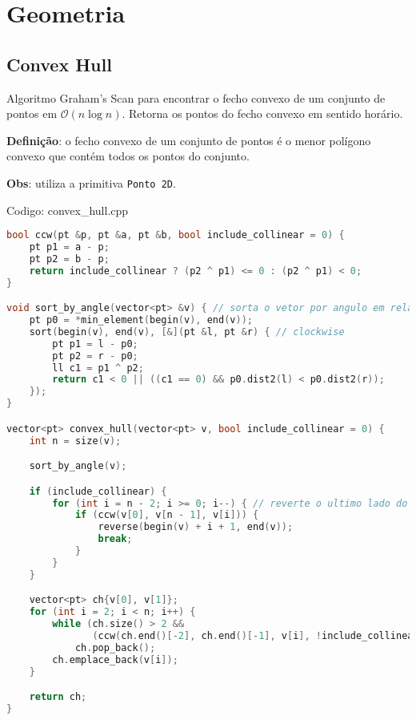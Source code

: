 \documentclass[10pt, a4paper, oneside]{book}
\begin{document}
\newpage

%
%
%
%

\chapter{Geometria}

\section{Convex Hull}


Algoritmo Graham's Scan para encontrar o fecho convexo de um conjunto de pontos em $\mathcal{O}(n \log n)$. Retorna os pontos do fecho convexo em sentido horário.



\textbf{Definição}: o fecho convexo de um conjunto de pontos é o menor polígono convexo que contém todos os pontos do conjunto.



\textbf{Obs}: utiliza a primitiva \texttt{Ponto 2D}. 

\hfill

Codigo: convex\_hull.cpp

\begin{lstlisting}[language=C++]
bool ccw(pt &p, pt &a, pt &b, bool include_collinear = 0) {
    pt p1 = a - p;
    pt p2 = b - p;
    return include_collinear ? (p2 ^ p1) <= 0 : (p2 ^ p1) < 0;
}

void sort_by_angle(vector<pt> &v) { // sorta o vetor por angulo em relacao ao pivo
    pt p0 = *min_element(begin(v), end(v));
    sort(begin(v), end(v), [&](pt &l, pt &r) { // clockwise
        pt p1 = l - p0;
        pt p2 = r - p0;
        ll c1 = p1 ^ p2;
        return c1 < 0 || ((c1 == 0) && p0.dist2(l) < p0.dist2(r));
    });
}

vector<pt> convex_hull(vector<pt> v, bool include_collinear = 0) {
    int n = size(v);

    sort_by_angle(v);

    if (include_collinear) {
        for (int i = n - 2; i >= 0; i--) { // reverte o ultimo lado do poligono
            if (ccw(v[0], v[n - 1], v[i])) {
                reverse(begin(v) + i + 1, end(v));
                break;
            }
        }
    }

    vector<pt> ch{v[0], v[1]};
    for (int i = 2; i < n; i++) {
        while (ch.size() > 2 &&
               (ccw(ch.end()[-2], ch.end()[-1], v[i], !include_collinear)))
            ch.pop_back();
        ch.emplace_back(v[i]);
    }

    return ch;
}
\end{lstlisting}
\hfill
\end{document}
